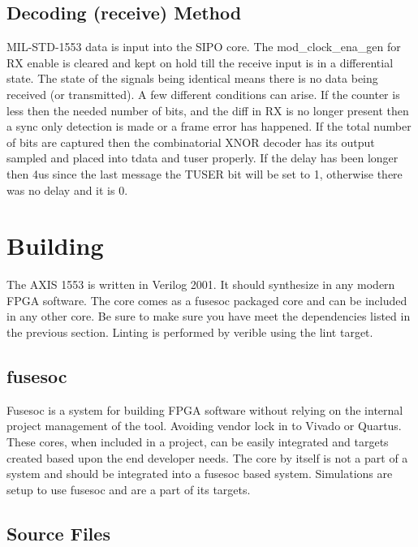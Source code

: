 \subsection{Decoding (receive) Method}
\par
MIL-STD-1553 data is input into the SIPO core. The mod\_clock\_ena\_gen for RX enable is cleared and kept on hold till the receive input is in a differential state. The state of the signals being identical means
there is no data being received (or transmitted). A few different conditions can arise. If the counter is less then the needed number of bits, and the diff in RX is no longer present then a sync only detection is
made or a frame error has happened. If the total number of bits are captured then the combinatorial XNOR decoder has its output sampled and placed into tdata and tuser properly. If the delay has been longer then 4us
since the last message the TUSER bit will be set to 1, otherwise there was no delay and it is 0.

\section{Building}

\par
The AXIS 1553 is written in Verilog 2001. It should synthesize in any modern FPGA software. The core comes as a fusesoc packaged core and can be included in any other core. Be sure to make sure you have meet the dependencies listed in the previous section. Linting is performed by verible using the lint target.

\subsection{fusesoc}
\par
Fusesoc is a system for building FPGA software without relying on the internal project management of the tool. Avoiding vendor lock in to Vivado or Quartus.
These cores, when included in a project, can be easily integrated and targets created based upon the end developer needs. The core by itself is not a part of
a system and should be integrated into a fusesoc based system. Simulations are setup to use fusesoc and are a part of its targets.

\subsection{Source Files}



